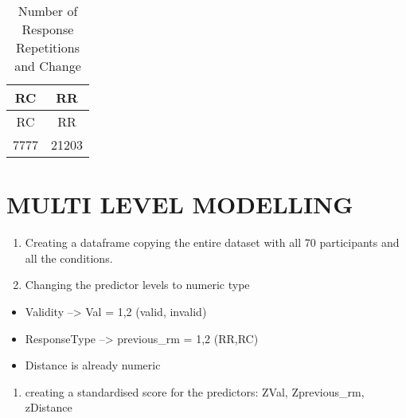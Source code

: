 \documentclass[
]{article}
\newenvironment{Shaded}{\begin{snugshade}}{\end{snugshade}}
\newcommand{\KeywordTok}[1]{\textcolor[rgb]{0.13,0.29,0.53}{\textbf{#1}}}
\newcommand{\NormalTok}[1]{#1}
\newcommand{\OperatorTok}[1]{\textcolor[rgb]{0.81,0.36,0.00}{\textbf{#1}}}
\newcommand{\StringTok}[1]{\textcolor[rgb]{0.31,0.60,0.02}{#1}}
\providecommand{\tightlist}{%
  \setlength{\itemsep}{0pt}\setlength{\parskip}{0pt}}
\begin{document}
\begin{longtable}[]{@{}cc@{}}
\caption{Number of Response Repetitions and Change}\tabularnewline
\toprule
RC & RR\tabularnewline
\midrule
\endfirsthead
\toprule
RC & RR\tabularnewline
\midrule
\endhead
7777 & 21203\tabularnewline
\bottomrule
\end{longtable}

\begin{Shaded}
\end{Shaded}

\hypertarget{multi-level-modelling}{%
\section{MULTI LEVEL MODELLING}\label{multi-level-modelling}}

\begin{enumerate}
\def\labelenumi{\arabic{enumi}.}
\tightlist
\item
  Creating a dataframe copying the entire dataset with all 70
  participants and all the conditions.
\item
  Changing the predictor levels to numeric type
\end{enumerate}

\begin{itemize}
\tightlist
\item
  Validity --\textgreater{} Val = 1,2 (valid, invalid)
\item
  ResponseType --\textgreater{} previous\_rm = 1,2 (RR,RC)
\item
  Distance is already numeric
\end{itemize}

\begin{enumerate}
\def\labelenumi{\arabic{enumi}.}
\setcounter{enumi}{2}
\tightlist
\item
  creating a standardised score for the predictors: ZVal, Zprevious\_rm,
  zDistance
\end{enumerate}
\end{document}
